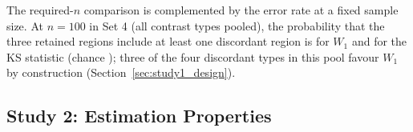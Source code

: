 \documentclass[AMA,Times1COL]{WileyNJDv5}
\begin{document}
The required-$n$ comparison is complemented by the error rate at a fixed sample size. At $n = 100$ in Set 4 (all contrast types pooled), the probability that the three retained regions include at least one discordant region is  for $W_1$ and  for the KS statistic (chance ); three of the four discordant types in this pool favour $W_1$ by construction (Section~\ref{sec:study1_design}).




\subsection{Study 2: Estimation Properties}\label{sec:study2}
\end{document}
